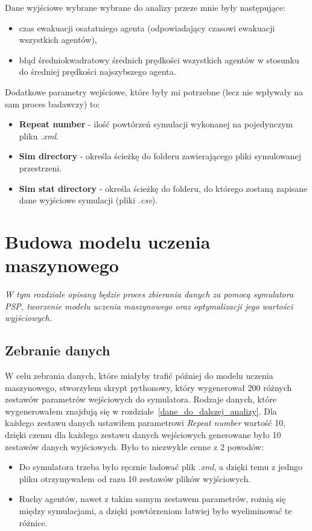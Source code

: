 \documentclass[12pt]{aghdpl}
\begin{document}
		Dane wyjściowe wybrane wybrane do analizy przeze mnie były następujące:
		
		\begin{itemize}
		\item czas ewakuacji osatatniego agenta (odpowiadający czasowi ewakuacji wszystkich agentów),
		\item błąd średniokwadratowy średnich prędkości wszystkich agentów w stosunku do średniej prędkości najszybszego agenta.
		\end{itemize}
		
		Dodatkowe parametry wejściowe, które były mi potrzebne (lecz nie wpływały na sam proces badawczy) to:
		\begin{itemize}
		\item \textbf{Repeat number} - ilość powtórzeń symulacji wykonanej na pojedynczym pliku \textit{.xml}.
		\item \textbf{Sim directory} - określa ścieżkę do folderu zawierającego pliki symulowanej przestrzeni.
		\item \textbf{Sim stat directory} - określa ścieżkę do folderu, do którego zostaną zapisane dane wyjściowe symulacji (pliki \textit{.csv}).
		\end{itemize}
		
	\newpage
	\chapter{Budowa modelu uczenia maszynowego}
	\textit{W tym rozdziale opisany będzie proces zbierania danych za pomocą symulatora PSP, tworzenie modelu uczenia maszynowego oraz optymalizacji jego wartości wyjściowych.}
	
		\section{Zebranie danych}
		W celu zebrania danych, które miałyby trafić później do modelu uczenia maszynowego, stworzyłem skrypt pythonowy, który wygenerował 200 różnych zestawów parametrów wejściowych do symulatora. Rodzaje danych, które wygenerowałem znajdują się w rozdziale~\ref{dane_do_dalszej_analizy}. Dla każdego zestawu danych ustawiłem parametrowi \textit{Repeat number} wartość 10, dzięki czemu dla każdego zestawu danych wejściowych generowane było 10 zestawów danych wyjściowych. Było to niezwykle cenne z 2 powodów:
		\begin{itemize}
		\item Do symulatora trzeba było ręcznie ładować plik \textit{.xml}, a dzięki temu z jedngo pliku otrzymywałem od razu 10 zestawów plików wyjściowych.
		\item Ruchy agentów, nawet z takim samym zestawem parametrów, rożnią się między symulacjami, a dzięki powtórzeniom łatwiej było wyeliminować te różnice.
		\end{itemize}
		
\end{document}
